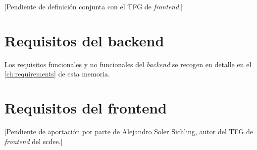 
[Pendiente de definición conjunta con el TFG de \textit{frontend}.]

\section{Requisitos del backend}

Los requisitos funcionales y no funcionales del \textit{backend} se
recogen en detalle en el \cref{ch:requirements} de esta memoria.

\section{Requisitos del frontend}


[Pendiente de aportación por parte de Alejandro Soler Sichling,
autor del TFG de \textit{frontend} del \ac{scdee}.]
